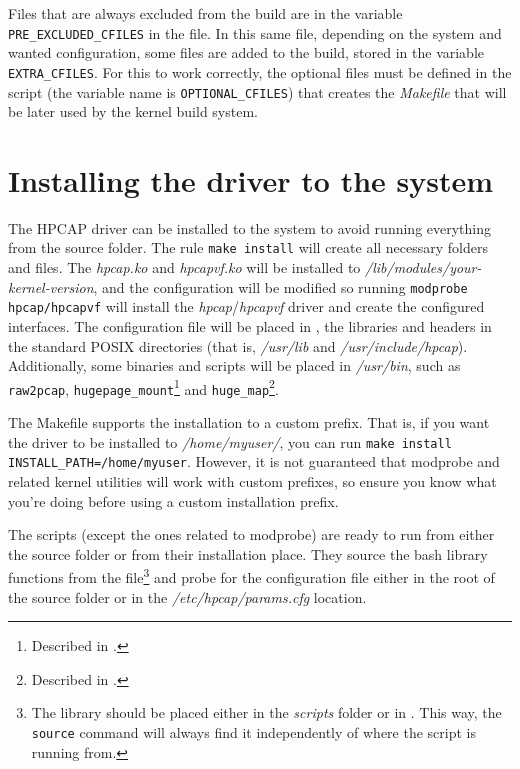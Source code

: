 \documentclass[oneside]{hpman}
\begin{document}
Files that are always excluded from the build are in the variable \texttt{PRE\_EXCLUDED\_CFILES} in the  file. In this same file, depending on the system and wanted configuration, some files are added to the build, stored in the variable \texttt{EXTRA\_CFILES}. For this to work correctly, the optional files must be defined in the  script (the variable name is \texttt{OPTIONAL\_CFILES}) that creates the \textit{Makefile} that will be later used by the kernel build system.

\section{Installing the driver to the system}
\label{sec:install}

The HPCAP driver can be installed to the system to avoid running everything from the source folder. The rule \texttt{make install} will create all necessary folders and files. The \textit{hpcap.ko} and \textit{hpcapvf.ko} will be installed to \textit{/lib/modules/your-kernel-version}, and the  configuration will be modified so running \texttt{modprobe hpcap/hpcapvf} will install the \textit{hpcap}/\textit{hpcapvf} driver and create the configured interfaces. The configuration file will be placed in , the libraries and headers in the standard POSIX directories (that is, \textit{/usr/lib} and \textit{/usr/include/hpcap}). Additionally, some binaries and scripts will be placed in \textit{/usr/bin}, such as \texttt{raw2pcap}, \texttt{hugepage\_mount}\footnote{Described in .} and \texttt{huge\_map}\footnote{Described in .}.

The Makefile supports the installation to a custom prefix. That is, if you want the driver to be installed to \textit{/home/myuser/}, you can run \texttt{make install INSTALL\_PATH=/home/myuser}. However, it is not guaranteed that modprobe and related kernel utilities will work with custom prefixes, so ensure you know what you're doing before using a custom installation prefix.

The scripts (except the ones related to modprobe) are ready to run from either the source folder or from their installation place. They source the bash library functions from the  file\footnote{The library should be placed either in the \textit{scripts} folder or in . This way, the \texttt{source} command will always find it independently of where the script is running from.} and probe for the configuration file either in the root of the source folder or in the \textit{/etc/hpcap/params.cfg} location.
\end{document}
